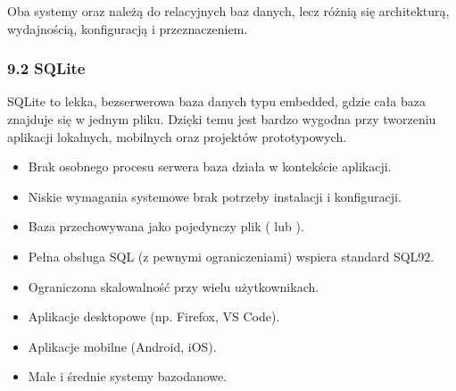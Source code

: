 \documentclass[letterpaper,10pt,polish]{sphinxmanual}
\begin{document}
\sphinxAtStartPar
Oba systemy \textendash{}  oraz  \textendash{} należą do relacyjnych baz danych, lecz różnią się architekturą, wydajnością, konfiguracją i przeznaczeniem.


\subsubsection{9.2 SQLite}
\label{\detokenize{rozdzial2/Konfiguracja_baz_danych/Konfiguracja_baz_danych:sqlite}}
\sphinxAtStartPar
SQLite to lekka, bezserwerowa baza danych typu embedded, gdzie cała baza znajduje się w jednym pliku. Dzięki temu jest bardzo wygodna przy tworzeniu aplikacji lokalnych, mobilnych oraz projektów prototypowych.

\sphinxAtStartPar
{}
\begin{itemize}
\item {} 
\sphinxAtStartPar
Brak osobnego procesu serwera \textendash{} baza działa w kontekście aplikacji.

\item {} 
\sphinxAtStartPar
Niskie wymagania systemowe \textendash{} brak potrzeby instalacji i konfiguracji.

\item {} 
\sphinxAtStartPar
Baza przechowywana jako pojedynczy plik ( lub ).

\item {} 
\sphinxAtStartPar
Pełna obsługa SQL (z pewnymi ograniczeniami) \textendash{} wspiera standard SQL\sphinxhyphen{}92.

\item {} 
\sphinxAtStartPar
Ograniczona skalowalność przy wielu użytkownikach.

\end{itemize}

\sphinxAtStartPar
{}
\begin{itemize}
\item {} 
\sphinxAtStartPar
Aplikacje desktopowe (np. Firefox, VS Code).

\item {} 
\sphinxAtStartPar
Aplikacje mobilne (Android, iOS).

\item {} 
\sphinxAtStartPar
Małe i średnie systemy bazodanowe.

\end{itemize}
\end{document}
